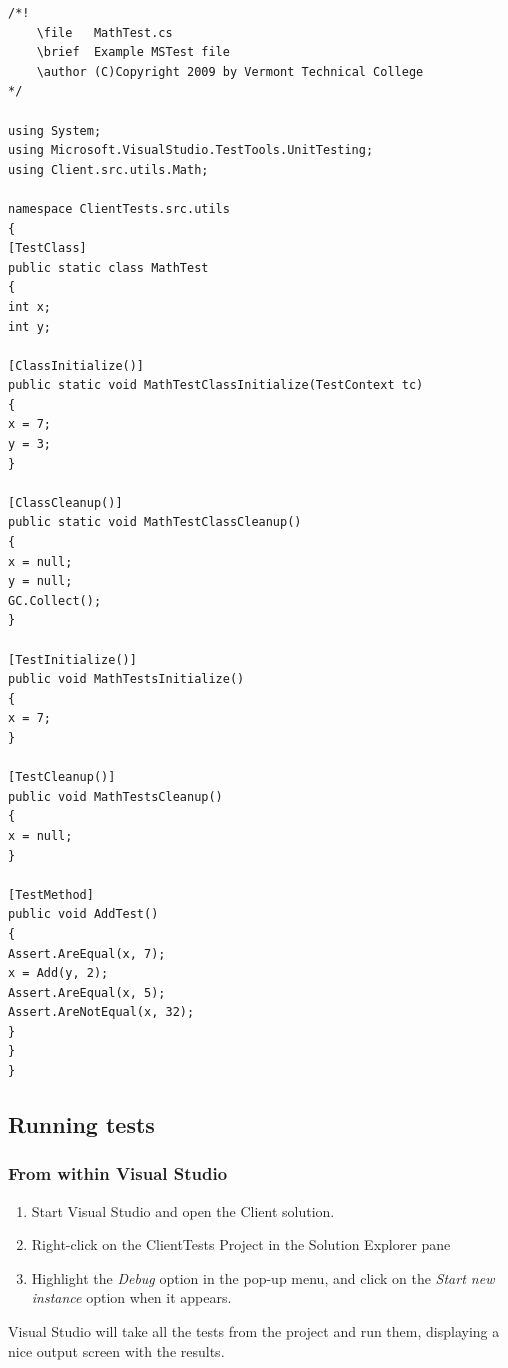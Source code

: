 \begin{lstlisting}
/*!
    \file   MathTest.cs
    \brief  Example MSTest file
    \author (C)Copyright 2009 by Vermont Technical College
*/

using System;
using Microsoft.VisualStudio.TestTools.UnitTesting;
using Client.src.utils.Math;

namespace ClientTests.src.utils
{
[TestClass]
public static class MathTest
{
int x;
int y;
		
[ClassInitialize()]
public static void MathTestClassInitialize(TestContext tc)
{
x = 7;
y = 3;
}

[ClassCleanup()]
public static void MathTestClassCleanup()
{
x = null;
y = null;
GC.Collect();
}
 
[TestInitialize()]
public void MathTestsInitialize()
{
x = 7;
}
 
[TestCleanup()]
public void MathTestsCleanup()
{
x = null;
}
		
[TestMethod]
public void AddTest()
{
Assert.AreEqual(x, 7);
x = Add(y, 2);
Assert.AreEqual(x, 5);
Assert.AreNotEqual(x, 32);
}  
}
}
\end{lstlisting}

\subsection{Running tests}
\subsubsection{From within Visual Studio}
\begin{enumerate}
\item Start Visual Studio and open the Client solution.
\item Right-click on the ClientTests Project in the Solution Explorer pane
\item Highlight the \textit{Debug} option in the pop-up menu, and click on the \textit{Start new instance} option when it appears. 
\end{enumerate} 
Visual Studio will take all the tests from the project and run them, displaying a nice output screen with the results. 

